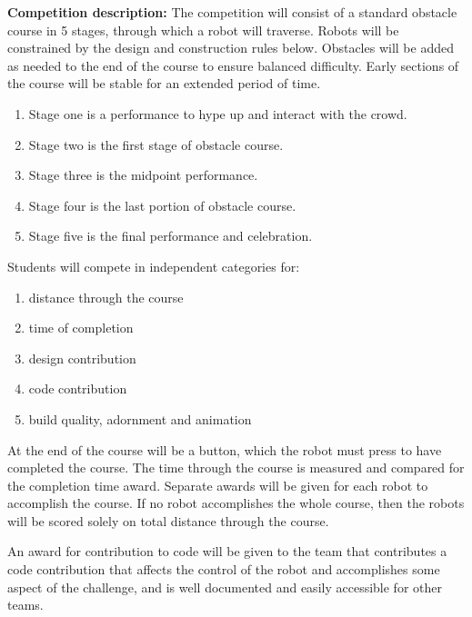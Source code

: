 \documentclass{article}
\begin{document}
\textbf{Competition description:} The competition will consist of a standard obstacle course in 5 stages, through which a robot will traverse. Robots will be constrained by the design and construction rules below. Obstacles will be added as needed to the end of the course to ensure balanced difficulty. Early sections of the course will be stable for an extended period of time. 
\begin{enumerate}
\item Stage one is a performance to hype up and interact with the crowd.

\item Stage two is the first stage of obstacle course. 

\item Stage three is the midpoint performance.

\item Stage four is the last portion of obstacle course. 

\item Stage five is the final performance and celebration. 
\end{enumerate}

Students will compete in independent categories for:
\begin{enumerate}
	
\item distance through the course
 
\item  time of completion
 
\item  design contribution
 
\item  code contribution
 
 \item build quality, adornment and animation
\end{enumerate}

 At the end of the course will be a button, which the robot must press to have completed the course. The time through the course is measured and compared for the completion time award. Separate awards will be given for each robot to accomplish the course. If no robot accomplishes the whole course, then the robots will be scored solely on total distance through the course. 
 
 An award for contribution to code will be given to the team that contributes a code contribution that affects the control of the robot and accomplishes some aspect of the challenge, and is well documented and easily accessible for other teams.
 
\end{document}
